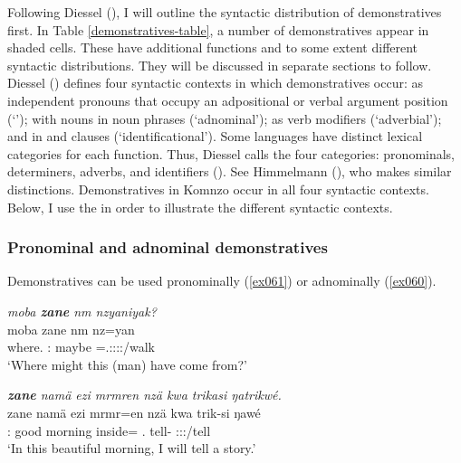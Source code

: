 Following Diessel (\citeyear{Diessel:2009tg}), I will outline the syntactic distribution of demonstratives first. In Table \ref{demonstratives-table}, a number of demonstratives appear in shaded cells. These have additional functions and to some extent different syntactic distributions. They will be discussed in separate sections to follow.\\

Diessel (\citeyear{Diessel:2009tg}) defines four syntactic contexts in which demonstratives occur: as independent pronouns that occupy an adpositional or verbal argument position (`'); with nouns in noun phrases (`adnominal'); as verb modifiers (`adverbial'); and in  and  clauses (`identificational'). Some languages have distinct lexical categories for each function. Thus, Diessel calls the four categories:  pronominals,  determiners,  adverbs, and  identifiers (\citeyear[3]{Diessel:2009tg}). See Himmelmann (\citeyear{Himmelmann:1996tp}), who makes similar distinctions. Demonstratives in Komnzo occur in all four syntactic contexts. Below, I use the  in order to illustrate the different syntactic contexts.\\

\subsubsection{Pronominal and adnominal demonstratives} \label{demprondet}

Demonstratives can be used pronominally (\ref{ex061}) or adnominally (\ref{ex060}).

\begin{exe}
	\ex \emph{moba \textbf{zane} nm nzyaniyak?}\\
	\gll moba zane nm nz=yan\\
	where.\Abl{} \Dem:\Prox{} maybe \Immpst=\Tsg.\Masc:\Sbj:\Nonpast:\Ipfv:\Venit/walk\\
	\trans `Where might this (man) have come from?'
	\label{ex061}
\end{exe}
\begin{exe}
	\ex \emph{\textbf{zane} namä ezi mrmren nzä kwa trikasi ŋatrikwé.}\\
	\gll zane namä ezi mrmr=en nzä kwa trik-si ŋawé\\
	\Dem:\Prox{} good morning inside=\Loc{} \Fsg.\Abs{} \Fut{} tell-\Nmlz{} \Fsg:\Sbj:\Nonpast:\Ipfv/tell\\
	\trans `In this beautiful morning, I will tell a story.'
	\label{ex060}
\end{exe}

